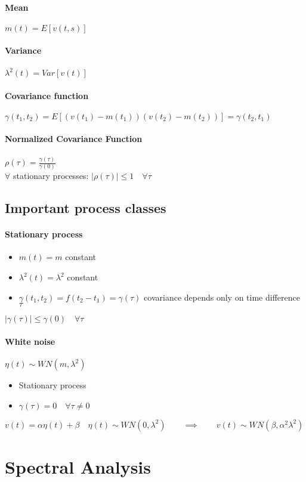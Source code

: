 \documentclass{article}
\begin{document}
\paragraph{Mean} $m(t)=E[v(t,s)]$
\paragraph{Variance}
$\lambda^2 (t)=Var[v(t)]$ 
\paragraph{Covariance function}
$\gamma(t_1,t_2)=E[(v(t_1)-m(t_1))(v(t_2)-m(t_2))]=\gamma(t_2,t_1)$
\paragraph{Normalized Covariance Function}
$\rho(\tau)=\frac{\gamma(\tau)}{\gamma(0)}$\\
$\forall$ stationary processes: $|\rho(\tau)|\leq1	\quad\forall\tau$

\subsection{Important process classes}

\paragraph{Stationary process}
\begin{itemize}
	\item $m(t)=m$ constant
	\item $\lambda^2 (t)=\lambda^2$ constant
	\item $\gamma(t_1,t_2)=f(t_2-t_1)=\gamma(\tau)$ covariance depends only on time difference $\tau$
\end{itemize}
$|\gamma(\tau)|\leq\gamma(0)		\quad\forall\tau$
\paragraph{White noise} $\eta(t)\sim WN(m,\lambda^2)$
\begin{itemize}
	\item Stationary process
	\item $\gamma(\tau)=0	\quad\forall\tau\neq0$
\end{itemize}
$v(t)=\alpha \eta (t)+\beta	\quad 
\eta (t)\sim WN(0,\lambda^2)	
\qquad\implies\qquad 
v(t)\sim WN(\beta,\alpha^2 \lambda^2)$

\section{Spectral Analysis}
\end{document}
